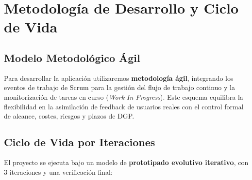 \section{Metodología de Desarrollo y Ciclo de Vida}

\subsection{Modelo Metodológico Ágil}
Para desarrollar la aplicación utilizaremos \textbf{metodología ágil}, integrando los eventos de trabajo de Scrum para la gestión del flujo de trabajo continuo y la monitorización de tareas en curso (\textit{Work In Progress}). Este esquema equilibra la flexibilidad en la asimilación de feedback de usuarios reales con el control formal de alcance, costes, riesgos y plazos de DGP.

\subsection{Ciclo de Vida por Iteraciones}
El proyecto se ejecuta bajo un modelo de \textbf{prototipado evolutivo iterativo}, con 3 iteraciones y una verificación final:

